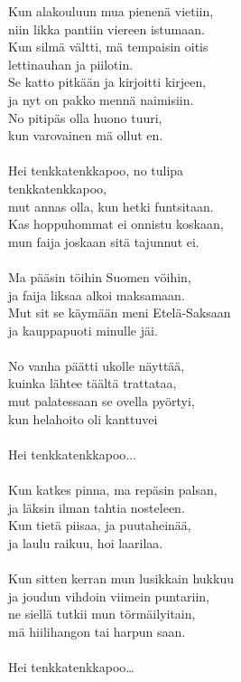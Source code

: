 
        Kun alakouluun mua pienenä vietiin, \\
        niin likka pantiin viereen istumaan. \\
        Kun silmä vältti, mä tempaisin oitis \\
        lettinauhan ja piilotin. \\
        Se katto pitkään ja kirjoitti kirjeen, \\
        ja nyt on pakko mennä naimisiin. \\
        No pitipäs olla huono tuuri, \\
        kun varovainen mä ollut en. \\
\hspace{10mm} \\
        Hei tenkkatenkkapoo, no tulipa \\
        tenkkatenkkapoo, \\
        mut annas olla, kun hetki funtsitaan. \\
        Kas hoppuhommat ei onnistu koskaan, \\
        mun faija joskaan sitä tajunnut ei. \\
\hspace{10mm} \\
        Ma pääsin töihin Suomen vöihin, \\
        ja faija liksaa alkoi maksamaan. \\
        Mut sit se käymään meni Etelä-Saksaan \\
        ja kauppapuoti minulle jäi. \\
\hspace{10mm} \\
        No vanha päätti ukolle näyttää, \\
        kuinka lähtee täältä trattataa, \\
        mut palatessaan se ovella pyörtyi, \\
        kun helahoito oli kanttuvei \\
\hspace{10mm} \\
        Hei tenkkatenkkapoo... \\
\hspace{10mm} \\
        Kun katkes pinna, ma repäsin palsan, \\
        ja läksin ilman tahtia nosteleen. \\
        Kun tietä piisaa, ja puutaheinää, \\
        ja laulu raikuu, hoi laarilaa. \\
\hspace{10mm} \\
        Kun sitten kerran mun lusikkain hukkuu \\
        ja joudun vihdoin viimein puntariin, \\
        ne siellä tutkii mun törmäilyitain, \\
        mä hiilihangon tai harpun saan. \\
\hspace{10mm} \\
        Hei tenkkatenkkapoo… \\
